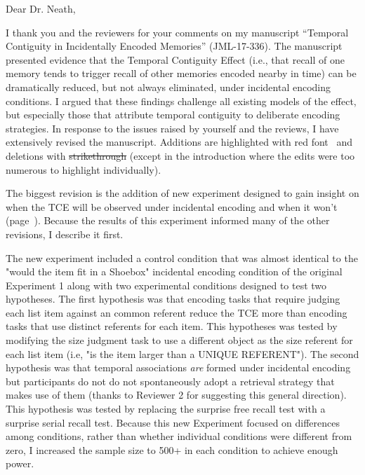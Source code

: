 \documentclass[12pt]{article}
\begin{document}
Dear Dr. Neath,
 

I thank you and the reviewers for your comments on my manuscript  ``Temporal Contiguity in Incidentally Encoded Memories'' (JML-17-336). The manuscript presented evidence that the Temporal Contiguity Effect (i.e., that recall of one memory tends to trigger recall of other memories encoded nearby in time) can be dramatically reduced, but not always eliminated, under incidental encoding conditions. I argued that these findings challenge all existing models of the effect, but especially those that attribute temporal contiguity to deliberate encoding strategies. In response to the issues raised by yourself and the reviews, I have extensively revised the manuscript. Additions are highlighted with   \color{red}red font\color{black}~ and deletions with \st{strikethrough} (except in the introduction where the edits were too numerous to highlight individually).

The biggest revision is the addition of new experiment designed to gain insight on when the TCE will be observed under incidental encoding and when it won't (page~\pageref{newexp}). Because the results of this experiment informed many of the other revisions, I describe it first.

The new experiment included a control condition that was almost identical to the "would the item fit in a Shoebox" incidental encoding condition of the original Experiment 1 along with two experimental conditions designed to test two hypotheses. The first hypothesis was that encoding tasks that require judging each list item against an common referent reduce the TCE more than encoding tasks that use distinct referents for each item. This hypotheses was tested by modifying the size judgment task to use a different object as the size referent for each list item (i.e, "is the item larger than a UNIQUE REFERENT"). The second hypothesis was that temporal associations \emph{are} formed under incidental encoding but participants do not do not spontaneously adopt a retrieval strategy that makes use of them (thanks to Reviewer 2 for suggesting this general direction). This hypothesis was tested by replacing the surprise free recall test with a surprise serial recall test. Because this new Experiment focused on differences among conditions, rather than whether individual conditions were different from zero, I increased the sample size to 500+ in each condition to achieve enough power.
\end{document}
